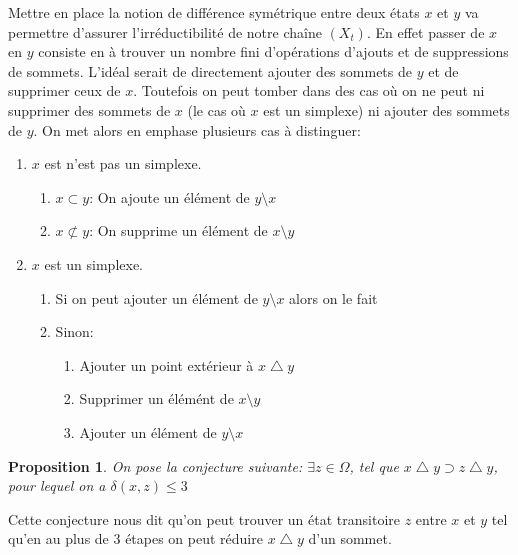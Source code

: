 \documentclass[11pt]{article}
\newtheorem{proposition}{Proposition}
\begin{document}
%

Mettre en place la notion de différence symétrique entre deux états $x$ et $y$ va permettre d'assurer l'irréductibilité de notre chaîne $(X_t)$. En effet passer de $x$ en $y$ consiste en à trouver un nombre fini d'opérations d'ajouts et de suppressions de sommets. L'idéal serait de directement ajouter des sommets de $y$ et de supprimer ceux de $x$. Toutefois on peut tomber dans des cas où on ne peut ni supprimer des sommets de $x$ (le cas où $x$ est un simplexe) ni ajouter des sommets de $y$. On met alors en emphase plusieurs cas à distinguer:

\begin{enumerate}
  \item $x$ est n'est pas un simplexe.
  \begin{enumerate}
    \item $x \subset y$: On ajoute un élément de $y \setminus x$
    \item $x \not\subset y$: On supprime un élément de $x \setminus y$
  \end{enumerate}
  \item $x$ est un simplexe.
  \begin{enumerate}
    \item Si on peut ajouter un élément de $y \setminus x$ alors on le fait
    \item Sinon:
    \begin{enumerate}
      \item Ajouter un point extérieur à $x \bigtriangleup y$
      \item Supprimer un élémént de $x \setminus y$
      \item Ajouter un élément de $y \setminus x$
    \end{enumerate}
  \end{enumerate}
\end{enumerate}

\begin{proposition}
  On pose la conjecture suivante: $\exists z \in \Omega$, tel que $x \bigtriangleup y \supset z \bigtriangleup y$, pour lequel on a $\delta(x,z) \leq{3}$
\end{proposition}

Cette conjecture nous dit qu'on peut trouver un état transitoire $z$ entre $x$ et $y$ tel qu'en au plus de 3 étapes on peut réduire $x \bigtriangleup y$ d'un sommet.
\end{document}
